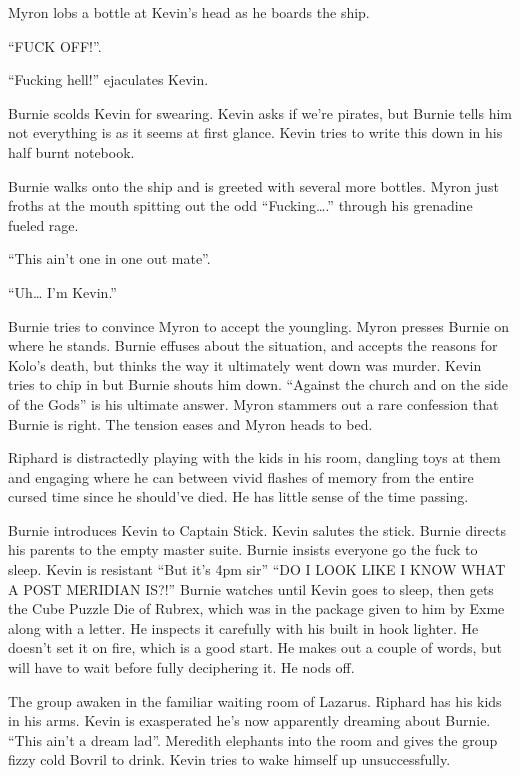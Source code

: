 Myron lobs a bottle at Kevin’s head as he boards the ship.\medskip

“FUCK OFF!”.\medskip

“Fucking hell!” ejaculates Kevin.\medskip

Burnie scolds Kevin for swearing. Kevin asks if we’re pirates, but Burnie tells him not everything is as it seems at first glance. Kevin tries to write this down in his half burnt notebook.\medskip

Burnie walks onto the ship and is greeted with several more bottles. Myron just froths at the mouth spitting out the odd “Fucking….” through his grenadine fueled rage.\medskip

“This ain’t one in one out mate”.\medskip

“Uh… I’m Kevin.”\medskip

Burnie tries to convince Myron to accept the youngling. Myron presses Burnie on where he stands. Burnie effuses about the situation, and accepts the reasons for Kolo’s death, but thinks the way it ultimately went down was murder. Kevin tries to chip in but Burnie shouts him down. “Against the church and on the side of the Gods” is his ultimate answer. Myron stammers out a rare confession that Burnie is right. The tension eases and Myron heads to bed.\medskip

Riphard is distractedly playing with the kids in his room, dangling toys at them and engaging where he can between vivid flashes of memory from the entire cursed time since he should’ve died. He has little sense of the time passing.\medskip

Burnie introduces Kevin to Captain Stick. Kevin salutes the stick. Burnie directs his parents to the empty master suite. Burnie insists everyone go the fuck to sleep. Kevin is resistant “But it’s 4pm sir” “DO I LOOK LIKE I KNOW WHAT A POST MERIDIAN IS?!” Burnie watches until Kevin goes to sleep, then gets the Cube Puzzle Die of Rubrex, which was in the package given to him by Exme along with a letter. He inspects it carefully with his built in hook lighter. He doesn’t set it on fire, which is a good start. He makes out a couple of words, but will have to wait before fully deciphering it. He nods off.\medskip

The group awaken in the familiar waiting room of Lazarus. Riphard has his kids in his arms. Kevin is exasperated he’s now apparently dreaming about Burnie. “This ain’t a dream lad”. Meredith elephants into the room and gives the group fizzy cold Bovril to drink. Kevin tries to wake himself up unsuccessfully.\medskip

